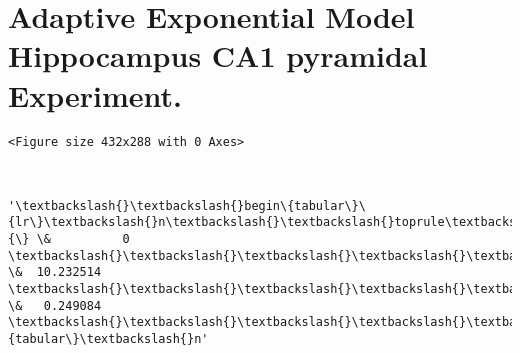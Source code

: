 \documentclass[11pt]{article}
\begin{document}
    \hypertarget{adaptive-exponential-model-hippocampus-ca1-pyramidal-experiment.}{%
\section{Adaptive Exponential Model Hippocampus CA1 pyramidal
Experiment.}\label{adaptive-exponential-model-hippocampus-ca1-pyramidal-experiment.}}

    
    \begin{verbatim}
<Figure size 432x288 with 0 Axes>
    \end{verbatim}

    
    \begin{center}
    \end{center}
    { \hspace*{\fill} \\}
    
            \begin{tcolorbox}[breakable, size=fbox, boxrule=.5pt, pad at break*=1mm, opacityfill=0]
\begin{Verbatim}[commandchars=\\\{\}]
'\textbackslash{}\textbackslash{}begin\{tabular\}\{lr\}\textbackslash{}n\textbackslash{}\textbackslash{}toprule\textbackslash{}n\{\} \&          0 \textbackslash{}\textbackslash{}\textbackslash{}\textbackslash{}\textbackslash{}n\textbackslash{}\textbackslash{}midrule\textbackslash{}nchi\textbackslash{}\textbackslash{}\_square
\&  10.232514 \textbackslash{}\textbackslash{}\textbackslash{}\textbackslash{}\textbackslash{}np\textbackslash{}\textbackslash{}\_value    \&   0.249084
\textbackslash{}\textbackslash{}\textbackslash{}\textbackslash{}\textbackslash{}n\textbackslash{}\textbackslash{}bottomrule\textbackslash{}n\textbackslash{}\textbackslash{}end\{tabular\}\textbackslash{}n'
\end{Verbatim}
\end{tcolorbox}
        
\end{document}
